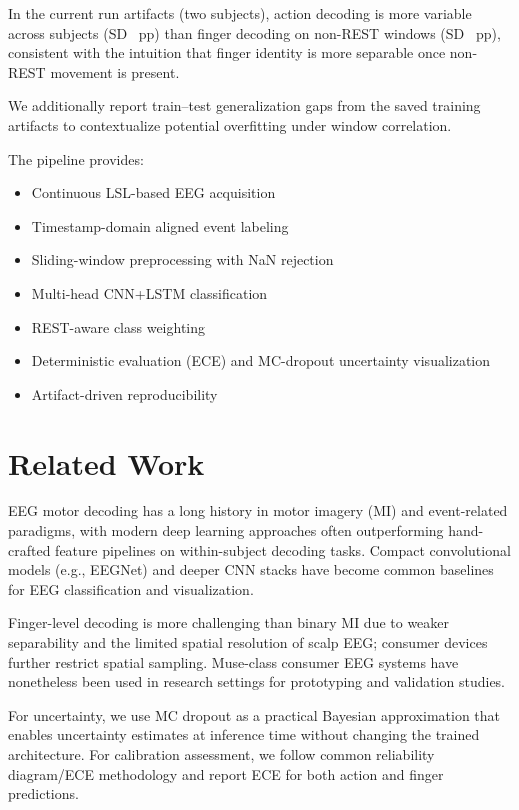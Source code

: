 \documentclass[conference]{IEEEtran}
\begin{document}
In the current run artifacts (two subjects), action decoding is more variable across subjects (SD \ActionAccSD~pp) than finger decoding on non-REST windows (SD \FingerAccSD~pp), consistent with the intuition that finger identity is more separable once non-REST movement is present.

We additionally report train--test generalization gaps from the saved training artifacts to contextualize potential overfitting under window correlation.

The pipeline provides:

\begin{itemize}
\item Continuous LSL-based EEG acquisition
\item Timestamp-domain aligned event labeling
\item Sliding-window preprocessing with NaN rejection
\item Multi-head CNN+LSTM classification
\item REST-aware class weighting
\item Deterministic evaluation (ECE) and MC-dropout uncertainty visualization
\item Artifact-driven reproducibility
\end{itemize}

\section{Related Work}
EEG motor decoding has a long history in motor imagery (MI) and event-related paradigms, with modern deep learning approaches often outperforming hand-crafted feature pipelines on within-subject decoding tasks. Compact convolutional models (e.g., EEGNet) and deeper CNN stacks have become common baselines for EEG classification and visualization. \cite{Lawhern2018EEGNet,Schirrmeister2017Deep}

Finger-level decoding is more challenging than binary MI due to weaker separability and the limited spatial resolution of scalp EEG; consumer devices further restrict spatial sampling. Muse-class consumer EEG systems have nonetheless been used in research settings for prototyping and validation studies. \cite{Krigolson2017Muse}

For uncertainty, we use MC dropout as a practical Bayesian approximation that enables uncertainty estimates at inference time without changing the trained architecture. \cite{Gal2016Dropout} For calibration assessment, we follow common reliability diagram/ECE methodology and report ECE for both action and finger predictions. \cite{Guo2017Calibration}
\end{document}
